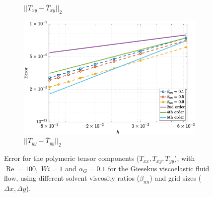 \documentclass[preprint, 12pt]{elsarticle}
\begin{document}
\begin{figure}[H]
\begin{subfigure}[b]{.46\textwidth}
        \caption{$||T_{xy} - \overline{T}_{xy}||_{2}$}
        \label{error_txy_2nd_Case1_giesekus_alphaG_0.1}
    \end{subfigure}
    \qquad
    \begin{subfigure}[b]{.46\textwidth}
        \includegraphics[width=\textwidth]{NormErr_2nd_Re_100_Wi_1_epsilon_0_xi_0_alphaG_0.1_Dt_1e-06_at_0.05_tipsim_1_MMS_12_Tyy.eps}
        \caption{$||T_{yy} - \overline{T}_{yy}||_{2}$}
        \label{error_tyy_2nd_Case1_giesekus_alphaG_0.1}
    \end{subfigure}
    \vspace{0.02cm}
    \caption{Error for the polymeric tensor components ($T_{xx}, T_{xy}, T_{yy}$), with $\operatorname{Re}=100,$ $Wi=1$ and $\alpha_{G} = 0.1$ for the Giesekus viscoelastic fluid flow, using different solvent viscosity ratios ($\beta_{nn}$) and grid sizes ($\Delta x, \Delta y$).\label{fig_Giesekus_error012}}
\end{figure}
\end{document}
